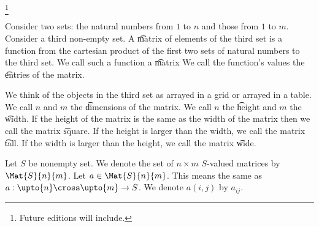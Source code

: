 
\footnote{Future editions will include.}


Consider two sets: the natural numbers from
$1$ to $n$ and those from $1$ to $m$.
Consider a third non-empty set.
A \t{matrix of} elements of the third set is a function from the cartesian product of the first two sets of natural numbers to the third set.
We call such a function a \t{matrix}
We call the function's values the \t{entries} of the matrix.

We think of the objects in the third set as arrayed in a grid or arrayed in a table.
We call $n$ and $m$ the \t{dimensions} of the matrix.
We call $n$ the \t{height} and $m$ the \t{width}.
If the height of the matrix is the same as the width of the matrix then we call the matrix \t{square}.
If the height is larger than the width, we call the matrix \t{tall}.
If the width is larger than the height, we call the matrix \t{wide}.


Let $S$ be nonempty set.
We denote the set of $n \times m$ $S$-valued matrices by $\Mat{S}{n}{m}$.
Let $a \in \Mat{S}{n}{m}$.
This means the same as $a: \upto{n} \cross \upto{m} \to S$.
We denote $a(i, j)$ by $a_{ij}$.

\blankpage
